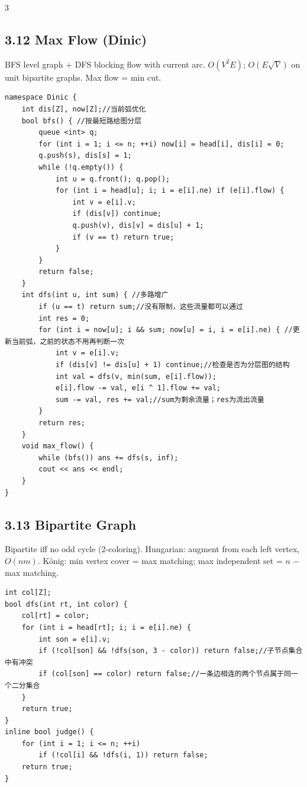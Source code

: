 \documentclass[8pt]{extarticle}
\begin{document}
\begin{multicols*}{3}
\subsection*{3.12 Max Flow (Dinic)}

BFS level graph + DFS blocking flow with current arc. $O(V^2E)$; $O(E\sqrt V)$ on unit bipartite graphs. Max flow = min cut.


\begin{lstlisting}
namespace Dinic {
    int dis[Z], now[Z];//当前弧优化
    bool bfs() { //按最短路给图分层
        queue <int> q;
        for (int i = 1; i <= n; ++i) now[i] = head[i], dis[i] = 0;
        q.push(s), dis[s] = 1;
        while (!q.empty()) {
            int u = q.front(); q.pop();
            for (int i = head[u]; i; i = e[i].ne) if (e[i].flow) {
                int v = e[i].v;
                if (dis[v]) continue;
                q.push(v), dis[v] = dis[u] + 1;
                if (v == t) return true;
            }
        }
        return false;
    }
    int dfs(int u, int sum) { //多路增广
        if (u == t) return sum;//没有限制，这些流量都可以通过
        int res = 0;
        for (int i = now[u]; i && sum; now[u] = i, i = e[i].ne) { //更新当前弧，之前的状态不用再判断一次
            int v = e[i].v;
            if (dis[v] != dis[u] + 1) continue;//检查是否为分层图的结构
            int val = dfs(v, min(sum, e[i].flow));
            e[i].flow -= val, e[i ^ 1].flow += val;
            sum -= val, res += val;//sum为剩余流量；res为流出流量
        }
        return res;
    }
    void max_flow() {
        while (bfs()) ans += dfs(s, inf);
        cout << ans << endl;
    }
}
\end{lstlisting}

\subsection*{3.13 Bipartite Graph}

Bipartite iff no odd cycle (2-coloring). Hungarian: augment from each left vertex, $O(nm)$. König: min vertex cover = max matching; max independent set = $n$ $-$ max matching.


\begin{lstlisting}
int col[Z];
bool dfs(int rt, int color) {
    col[rt] = color;
    for (int i = head[rt]; i; i = e[i].ne) {
        int son = e[i].v;
        if (!col[son] && !dfs(son, 3 - color)) return false;//子节点集合中有冲突
        if (col[son] == color) return false;//一条边相连的两个节点属于同一个二分集合
    }
    return true;
}
inline bool judge() {
    for (int i = 1; i <= n; ++i)
        if (!col[i] && !dfs(i, 1)) return false;
    return true;
}
\end{lstlisting}


\end{multicols*}
\end{document}
